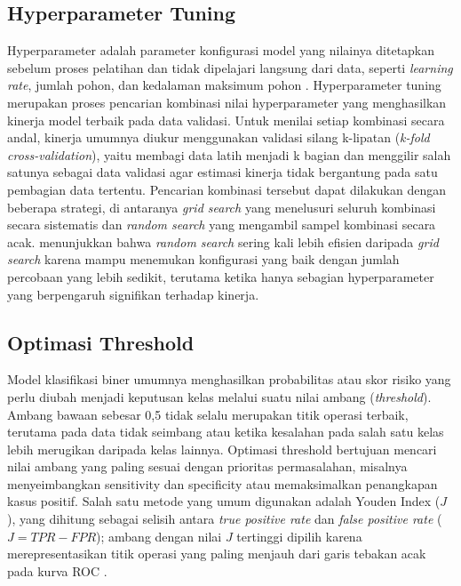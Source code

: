 \subsection{Hyperparameter Tuning}
Hyperparameter adalah parameter konfigurasi model yang nilainya ditetapkan sebelum proses pelatihan dan tidak dipelajari langsung dari data, seperti \emph{learning rate}, jumlah pohon, dan kedalaman maksimum pohon \autocite{Bergstra2012Random}. Hyperparameter tuning merupakan proses pencarian kombinasi nilai hyperparameter yang menghasilkan kinerja model terbaik pada data validasi. Untuk menilai setiap kombinasi secara andal, kinerja umumnya diukur menggunakan validasi silang k-lipatan (\emph{k-fold cross-validation}), yaitu membagi data latih menjadi k bagian dan menggilir salah satunya sebagai data validasi agar estimasi kinerja tidak bergantung pada satu pembagian data tertentu. Pencarian kombinasi tersebut dapat dilakukan dengan beberapa strategi, di antaranya \emph{grid search} yang menelusuri seluruh kombinasi secara sistematis dan \emph{random search} yang mengambil sampel kombinasi secara acak. \textcite{Bergstra2012Random} menunjukkan bahwa \emph{random search} sering kali lebih efisien daripada \emph{grid search} karena mampu menemukan konfigurasi yang baik dengan jumlah percobaan yang lebih sedikit, terutama ketika hanya sebagian hyperparameter yang berpengaruh signifikan terhadap kinerja.

\subsection{Optimasi Threshold}
Model klasifikasi biner umumnya menghasilkan probabilitas atau skor risiko yang perlu diubah menjadi keputusan kelas melalui suatu nilai ambang (\emph{threshold}). Ambang bawaan sebesar 0,5 tidak selalu merupakan titik operasi terbaik, terutama pada data tidak seimbang atau ketika kesalahan pada salah satu kelas lebih merugikan daripada kelas lainnya. Optimasi threshold bertujuan mencari nilai ambang yang paling sesuai dengan prioritas permasalahan, misalnya menyeimbangkan sensitivity dan specificity atau memaksimalkan penangkapan kasus positif. Salah satu metode yang umum digunakan adalah Youden Index ($J$), yang dihitung sebagai selisih antara \emph{true positive rate} dan \emph{false positive rate} ($J = TPR - FPR$); ambang dengan nilai $J$ tertinggi dipilih karena merepresentasikan titik operasi yang paling menjauh dari garis tebakan acak pada kurva ROC \autocite{Habibzadeh2016Cutoff}.

